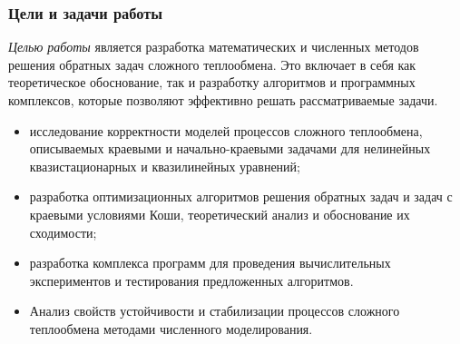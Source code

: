 \begin{frame}
    \frametitle{Цели и задачи работы}
    \textit{Целью работы} является разработка математических
    и численных методов решения обратных задач сложного теплообмена.
    Это включает в себя как теоретическое обоснование,
    так и разработку алгоритмов и программных комплексов,
    которые позволяют эффективно решать рассматриваемые задачи.
    \begin{itemize}
        \item исследование корректности моделей процессов сложного теплообмена,
        описываемых краевыми и начально-краевыми задачами для нелинейных
        квазистационарных и квазилинейных уравнений;
        \item разработка оптимизационных алгоритмов решения обратных задач и
        задач с краевыми условиями Коши, теоретический анализ и обоснование их сходимости;
        \item разработка комплекса программ для проведения вычислительных
        экспериментов и тестирования предложенных алгоритмов.
        \item Анализ свойств устойчивости и стабилизации
        процессов сложного теплообмена методами численного моделирования.
    \end{itemize}
\end{frame}

